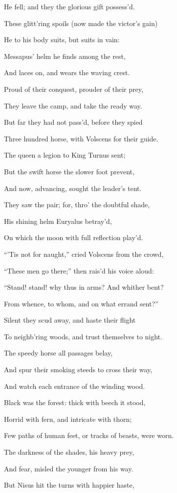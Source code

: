 He fell; and they the glorious gift possess’d.

These glitt’ring spoils (now made the victor’s gain)

He to his body suits, but suits in vain:

Messapus’ helm he finds among the rest,

And laces on, and wears the waving crest.

Proud of their conquest, prouder of their prey,

They leave the camp, and take the ready way.

But far they had not pass’d, before they spied

Three hundred horse, with Volscens for their guide.

The queen a legion to King Turnus sent;

But the swift horse the slower foot prevent,

And now, advancing, sought the leader’s tent.

They saw the pair; for, thro’ the doubtful shade,

His shining helm Euryalus betray’d,

On which the moon with full reflection play’d.

“’Tis not for naught,” cried Volscens from the crowd,

“These men go there;” then rais’d his voice aloud:

“Stand! stand! why thus in arms? And whither bent?

From whence, to whom, and on what errand sent?”

Silent they scud away, and haste their flight

To neighb’ring woods, and trust themselves to night.

The speedy horse all passages belay,

And spur their smoking steeds to cross their way,

And watch each entrance of the winding wood.

Black was the forest: thick with beech it stood,

Horrid with fern, and intricate with thorn;

Few paths of human feet, or tracks of beasts, were worn.

The darkness of the shades, his heavy prey,

And fear, misled the younger from his way.

But Nisus hit the turns with happier haste,

